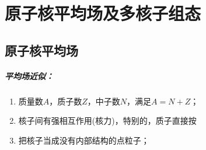 \chapter{原子核平均场及多核子组态}

\section{原子核平均场}
\paragraph*{平均场近似：}
\begin{enumerate}
	\item 质量数$A$，质子数$Z$，中子数$N$，满足$A=N+Z$；
	\item 核子间有强相互作用(核力)，特别的，质子直接按
	\item 把核子当成没有内部结构的点粒子；
\end{enumerate}

